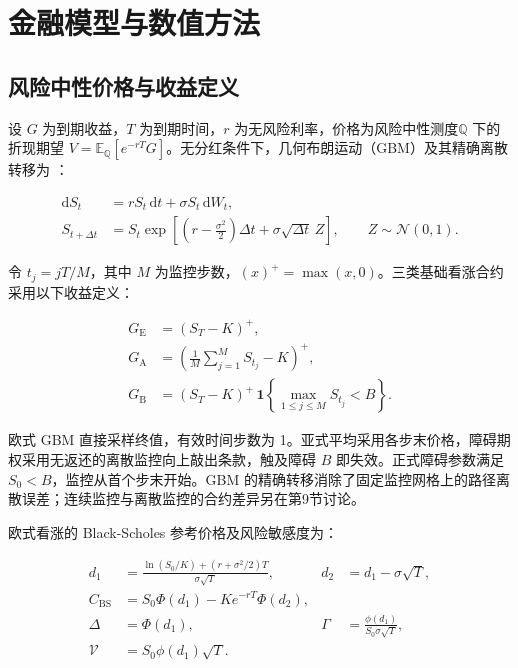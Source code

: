 \documentclass[UTF8,a4paper,zihao=5,fontset=none]{ctexart}
\begin{document}
\section{金融模型与数值方法}

\subsection{风险中性价格与收益定义}

设 $G$ 为到期收益，$T$ 为到期时间，$r$ 为无风险利率，价格为风险中性测度$\mathbb Q$ 下的折现期望 $V=\mathbb E_{\mathbb Q}[e^{-rT}G]$。无分红条件下，几何布朗运动（GBM）及其精确离散转移为 \cite{r1}：


\nopagebreak[4]
\begin{equation}
\label{eq:1}
\begin{aligned}
\mathrm dS_t &= rS_t\,\mathrm dt+\sigma S_t\,\mathrm dW_t,\\
S_{t+\Delta t} &= S_t\exp\!\left[
\left(r-\frac{\sigma^2}{2}\right)\Delta t
+\sigma\sqrt{\Delta t}\,Z\right],\qquad Z\sim\mathcal N(0,1).
\end{aligned}
\end{equation}

令 $t_j=jT/M$，其中 $M$ 为监控步数，$(x)^+=\max(x,0)$。三类基础看涨合约采用以下收益定义：


\nopagebreak[4]
\begin{equation}
\label{eq:2}
\begin{aligned}
G_{\mathrm E} &= (S_T-K)^+,\\
G_{\mathrm A} &= \left(\frac1M\sum_{j=1}^{M}S_{t_j}-K\right)^+,\\
G_{\mathrm B} &= (S_T-K)^+\,
\mathbf1\!\left\{\max_{1\leq j\leq M}S_{t_j}<B\right\}.
\end{aligned}
\end{equation}

欧式 GBM 直接采样终值，有效时间步数为 1。亚式平均采用各步末价格，障碍期权采用无返还的离散监控向上敲出条款，触及障碍 $B$ 即失效。正式障碍参数满足 $S_0<B$，监控从首个步末开始。GBM 的精确转移消除了固定监控网格上的路径离散误差；连续监控与离散监控的合约差异另在第9节讨论。


欧式看涨的 Black-Scholes 参考价格及风险敏感度为：


\nopagebreak[4]
\begin{equation}
\label{eq:3}
\begin{aligned}
d_1 &= \frac{\ln(S_0/K)+(r+\sigma^2/2)T}{\sigma\sqrt T},
&d_2 &= d_1-\sigma\sqrt T,\\
C_{\mathrm{BS}} &= S_0\Phi(d_1)-Ke^{-rT}\Phi(d_2),\\
\Delta &= \Phi(d_1),
&\Gamma &= \frac{\phi(d_1)}{S_0\sigma\sqrt T},\\
\mathcal V &= S_0\phi(d_1)\sqrt T.
\end{aligned}
\end{equation}
\end{document}
